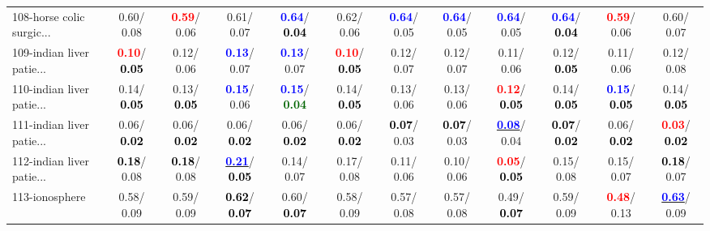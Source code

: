 \begin{table}[h]
\begin{center}
{\begin{tabular}{lc|c|c|c|c|c|c|c|c|c|c}
108-horse colic surgic... &   0.60/  0.08 & \textcolor{red}{\textbf{  0.59}}/  0.06 &   0.61/  0.07 & \textcolor{blue}{\textbf{  0.64}}/\textcolor{black}{\textbf{  0.04}} &   0.62/  0.06 & \textcolor{blue}{\textbf{  0.64}}/  0.05 & \textcolor{blue}{\textbf{  0.64}}/  0.05 & \textcolor{blue}{\textbf{  0.64}}/  0.05 & \textcolor{blue}{\textbf{  0.64}}/\textcolor{black}{\textbf{  0.04}} & \textcolor{red}{\textbf{  0.59}}/  0.06 &   0.60/  0.07 \\
109-indian liver patie... & \textcolor{red}{\textbf{  0.10}}/\textcolor{black}{\textbf{  0.05}} &   0.12/  0.06 & \textcolor{blue}{\textbf{  0.13}}/  0.07 & \textcolor{blue}{\textbf{  0.13}}/  0.07 & \textcolor{red}{\textbf{  0.10}}/\textcolor{black}{\textbf{  0.05}} &   0.12/  0.07 &   0.12/  0.07 &   0.11/  0.06 &   0.12/\textcolor{black}{\textbf{  0.05}} &   0.11/  0.06 &   0.12/  0.08 \\
110-indian liver patie... &   0.14/\textcolor{black}{\textbf{  0.05}} &   0.13/\textcolor{black}{\textbf{  0.05}} & \textcolor{blue}{\textbf{  0.15}}/  0.06 & \textcolor{blue}{\textbf{  0.15}}/\textcolor{darkgreen}{\textbf{  0.04}} &   0.14/\textcolor{black}{\textbf{  0.05}} &   0.13/  0.06 &   0.13/  0.06 & \textcolor{red}{\textbf{  0.12}}/\textcolor{black}{\textbf{  0.05}} &   0.14/\textcolor{black}{\textbf{  0.05}} & \textcolor{blue}{\textbf{  0.15}}/\textcolor{black}{\textbf{  0.05}} &   0.14/\textcolor{black}{\textbf{  0.05}} \\ \hline
111-indian liver patie... &   0.06/\textcolor{black}{\textbf{  0.02}} &   0.06/\textcolor{black}{\textbf{  0.02}} &   0.06/\textcolor{black}{\textbf{  0.02}} &   0.06/\textcolor{black}{\textbf{  0.02}} &   0.06/\textcolor{black}{\textbf{  0.02}} & \textcolor{black}{\textbf{  0.07}}/  0.03 & \textcolor{black}{\textbf{  0.07}}/  0.03 & \underline{\textcolor{blue}{\textbf{  0.08}}}/  0.04 & \textcolor{black}{\textbf{  0.07}}/\textcolor{black}{\textbf{  0.02}} &   0.06/\textcolor{black}{\textbf{  0.02}} & \textcolor{red}{\textbf{  0.03}}/\textcolor{black}{\textbf{  0.02}} \\
112-indian liver patie... & \textcolor{black}{\textbf{  0.18}}/  0.08 & \textcolor{black}{\textbf{  0.18}}/  0.08 & \underline{\textcolor{blue}{\textbf{  0.21}}}/\textcolor{black}{\textbf{  0.05}} &   0.14/  0.07 &   0.17/  0.08 &   0.11/  0.06 &   0.10/  0.06 & \textcolor{red}{\textbf{  0.05}}/\textcolor{black}{\textbf{  0.05}} &   0.15/  0.08 &   0.15/  0.07 & \textcolor{black}{\textbf{  0.18}}/  0.07 \\
113-ionosphere &   0.58/  0.09 &   0.59/  0.09 & \textcolor{black}{\textbf{  0.62}}/\textcolor{black}{\textbf{  0.07}} &   0.60/\textcolor{black}{\textbf{  0.07}} &   0.58/  0.09 &   0.57/  0.08 &   0.57/  0.08 &   0.49/\textcolor{black}{\textbf{  0.07}} &   0.59/  0.09 & \textcolor{red}{\textbf{  0.48}}/  0.13 & \underline{\textcolor{blue}{\textbf{  0.63}}}/  0.09 \\

\end{tabular}}
\end{center}
\end{table}
